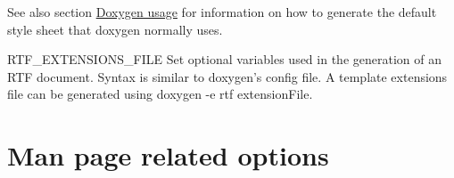 \begin{DoxyDescription}
See also section \hyperlink{doxygen_usage}{Doxygen usage} for information on how to generate the default style sheet that doxygen normally uses.

\label{config_cfg_rtf_extensions_file}
\hypertarget{config_cfg_rtf_extensions_file}{}
 
\item[{\ttfamily RTF\_\-EXTENSIONS\_\-FILE} ]Set optional variables used in the generation of an RTF document. Syntax is similar to doxygen's config file. A template extensions file can be generated using {\ttfamily doxygen -\/e rtf extensionFile}.


\end{DoxyDescription}\hypertarget{config_man_output}{}\section{Man page related options}\label{config_man_output}
\label{config_cfg_generate_man}
\hypertarget{config_cfg_generate_man}{}
 
